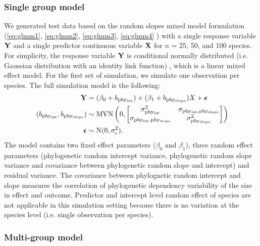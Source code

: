 \documentclass[12pt]{article}
\begin{document}
\subsubsection*{Single group model}

We generated test data based on the random slopes mixed model formulation (\ref{eq:glmm1}, \ref{eq:glmm2}, \ref{eq:glmm3}, \ref{eq:glmm4} ) with a single response variable ${\mathbf Y}$ and a single predictor continuous variable ${\mathbf X}$ for $n$ = 25, 50, and 100 species.
For simplicity, the response variable ${\mathbf Y}$ is conditional normally distributed (i.e. Gaussian distribution with an identity link function) , which is a linear mixed effect model. 
For the first set of simulation, we simulate one observation per species.
The full simulation model is the following:
\begin{align}
{\mathbf Y} & = (\beta_0 + b_{\mathrm{phy_{int}}}) + (\beta_1 + b_{\mathrm{phy_{slope}}}) X + {\boldsymbol \epsilon}  \label{eq:ss_sim}\\\
(b_{\mathrm{phy_{int}}}, b_{\mathrm{phy_{slope}}}) & \sim \textrm{MVN} \left( 0, \begin{bmatrix}
\sigma^2_{\mathrm{phy_{int}}} & \sigma_{\mathrm{phy_{int},phy_{slope}}} \\ 
\sigma_{\mathrm{phy_{int},phy_{slope}}} & \sigma^2_{\mathrm{phy_{slope}}}
\end{bmatrix} 
\right) \\ 
{\boldsymbol \epsilon} & \sim \textrm{N} ( 0 , \sigma_{\epsilon}^2) .
\end{align}
The model contains two fixed effect parameters ($\beta_0$ and $\beta_1$), three random effect parameters (phylogenetic random intercept variance, phylogenetic random slope variance and covariance between phylogenetic random slope and intercept) and residual variance.  
The covariance between phylognetic random intercept and slope measures the correlation of phylogenetic dependency variability of the size in effect and outcome.
Predictor and intercept level random effect of species are not applicable in this simulation setting because there is no variation at the species level (i.e. single observation per species).

\subsubsection*{Multi-group model}
\end{document}
